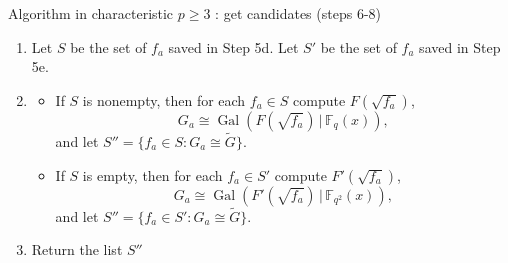 \documentclass[xcolor=dvipsnames]{beamer}
\theoremstyle{plain}
\newcommand{\wt}[1]{\widetilde{#1}}
\newcommand{\FF}{\mathbb{F}}
\DeclareMathOperator{\Gal}{Gal}
\begin{document}
  \begin{frame}{Algorithm in characteristic $p\geq 3$ : get candidates (steps 6-8)}
    \begin{enumerate}
      \item[6.]
        Let $S$ be the set of $f_a$
        saved in Step 5d.
        Let $S'$ be the set of $f_a$
        saved in Step 5e.
      \item[7.]
        \begin{itemize}
          \item
            If $S$ is nonempty,
            then
            for each $f_a\in S$
            compute
            $F(\sqrt{f_a})$,
            \[
              G_a\cong\Gal(F(\sqrt{f_a})\,|\,\FF_q(x)),
            \]
            and let
            $S''=
            \{f_a\in S:G_a\cong\wt{G}\}$.
          \item
            If $S$ is empty,
            then
            for each $f_a\in S'$
            compute
            $F'(\sqrt{f_a})$,
            \[
              G_a\cong\Gal(F'(\sqrt{f_a})\,|\,\FF_{q^2}(x)),
            \]
            and let
            $S''=
            \{f_a\in S':G_a\cong\wt{G}\}$.
        \end{itemize}
      \item[8.]
        Return the list $S''$
    \end{enumerate}
  \end{frame}
\end{document}
